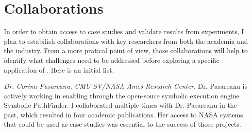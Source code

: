 \documentclass[10pt]{article}
\newcounter{list}
\begin{document}
\vspace{-4mm}
\section{Collaborations}




  In order to obtain access to case studies and validate results from
  experiments, I plan to estabilish collaborations with key
  researchers from both the academia and the industry. From a more
  pratical point of view, those collaborations will help to identify
  what challenges need to be addressed before exploring a specific
  application of \PSE{}. Here is an initial list:

  
  \textit{Dr. Corina Pasareanu, CMU SV/NASA Ames Research
    Center}. Dr. Pasareanu is actively working in enabling \PSE{}
  through the open-souce symbolic execution engine Symbolic
  PathFinder. I collaborated multiple times with Dr. Pasareanu in the
  past, which resulted in four academic publications. Her access to
  NASA systems that could be used as case studies was essential to the
  success of those projects.
\end{document}
